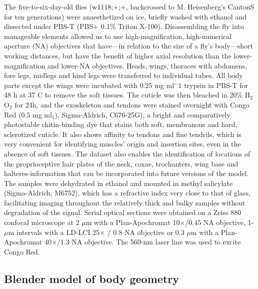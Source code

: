 \documentclass[sn-mathphys-num]{sn-jnl}%
\theoremstyle{thmstyleone}	%
\theoremstyle{thmstyletwo}	%
\theoremstyle{thmstylethree}	%
\begin{document}
The five-to-six-day-old flies (w1118;+;+, backcrossed to M. Heisenberg's CantonS for ten generations) were anaesthetized on ice, briefly washed with ethanol and dissected under PBS-T (PBS+ 0.1\% Triton X-100).
Disassembling the fly into manageable elements allowed us to use high-magnification, high-numerical aperture (NA) objectives that have—in relation to the size of a fly’s body—short working distances, but have the benefit of higher axial resolution than the lower-magnification and lower-NA objectives. 
Heads, wings, thoraces with abdomens, fore legs, midlegs and hind legs were transferred to individual tubes.
All body parts except the wings 
were incubated with 0.25 mg ml$ ^-1 $ trypsin in PBS-T for 48 h at 37 C to remove the soft tissues.
The cuticle was then bleached in 20\% H$ _2 $O$ _2 $ for 24h, and the exoskeleton and tendons were stained overnight with Congo Red (0.5 mg ml$ _1 $), Sigma-Aldrich, C676-25G), a bright and comparatively photostable chitin-binding dye that stains both soft, membranous and hard, sclerotized cuticle.
It also shows affinity to tendons and fine tendrils, which is very convenient for identifying muscles' origin and insertion sites, even in the absence of soft tissues.
The dataset also enables the identification of locations of the proprioceptive hair plates of the neck, coxae, trochanters, wing base and halteres-information that can be incorporated into future versions of the model. 
The samples were dehydrated in ethanol and mounted in methyl salicylate (Sigma-Aldrich, M6752), which has a refractive index very close to that of glass, facilitating imaging throughout the relatively thick and bulky samples without degradation of the signal. 
Serial optical sections were obtained on a Zeiss 880 confocal microscope at 2 $ \mu $m with a Plan-Apochromat 10×/0.45 NA objective, 1-$ \mu $m intervals with a LD-LCI 25$ \times $ / 0.8 NA objective or 0.3 $ \mu $m with a Plan-Apochromat 40×/1.3 NA objective. The 560-nm laser line was used to excite Congo Red.



\subsection{Blender model of body geometry} \label{sec:derivation}
\end{document}
